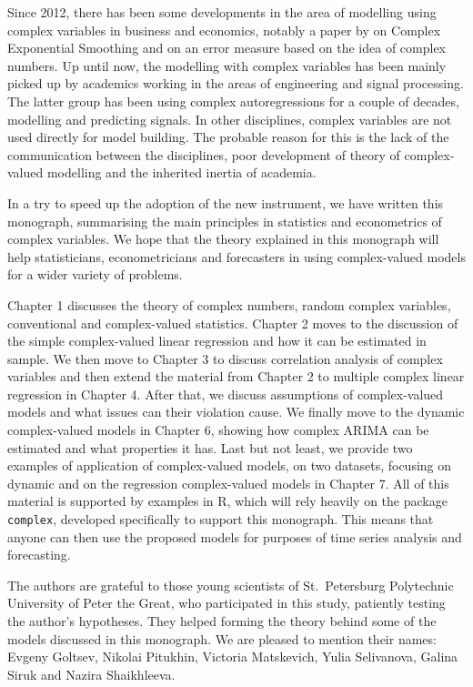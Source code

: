 \documentclass[
]{book}
\begin{document}
Since 2012, there has been some developments in the area of modelling using complex variables in business and economics, notably a paper by \citet{Svetunkov2022} on Complex Exponential Smoothing and \citet{Kourentzes2021a} on an error measure based on the idea of complex numbers. Up until now, the modelling with complex variables has been mainly picked up by academics working in the areas of engineering and signal processing. The latter group has been using complex autoregressions for a couple of decades, modelling and predicting signals. In other disciplines, complex variables are not used directly for model building. The probable reason for this is the lack of the communication between the disciplines, poor development of theory of complex-valued modelling and the inherited inertia of academia.

In a try to speed up the adoption of the new instrument, we have written this monograph, summarising the main principles in statistics and econometrics of complex variables. We hope that the theory explained in this monograph will help statisticians, econometricians and forecasters in using complex-valued models for a wider variety of problems.

Chapter 1 discusses the theory of complex numbers, random complex variables, conventional and complex-valued statistics. Chapter 2 moves to the discussion of the simple complex-valued linear regression and how it can be estimated in sample. We then move to Chapter 3 to discuss correlation analysis of complex variables and then extend the material from Chapter 2 to multiple complex linear regression in Chapter 4. After that, we discuss assumptions of complex-valued models and what issues can their violation cause. We finally move to the dynamic complex-valued models in Chapter 6, showing how complex ARIMA can be estimated and what properties it has. Last but not least, we provide two examples of application of complex-valued models, on two datasets, focusing on dynamic and on the regression complex-valued models in Chapter 7. All of this material is supported by examples in R, which will rely heavily on the package \texttt{complex}, developed specifically to support this monograph. This means that anyone can then use the proposed models for purposes of time series analysis and forecasting.

The authors are grateful to those young scientists of St.~Petersburg Polytechnic University of Peter the Great, who participated in this study, patiently testing the author's hypotheses. They helped forming the theory behind some of the models discussed in this monograph. We are pleased to mention their names: Evgeny Goltsev, Nikolai Pitukhin, Victoria Matskevich, Yulia Selivanova, Galina Siruk and Nazira Shaikhleeva.
\end{document}
